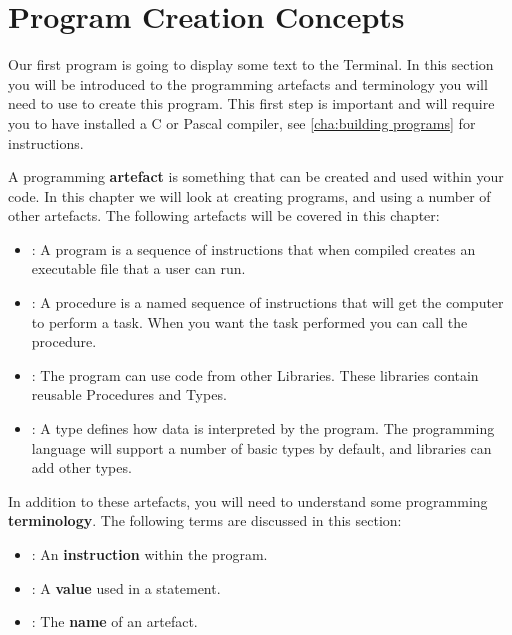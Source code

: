 \clearpage
\section{Program Creation Concepts} %
\label{sec:program_creation_concepts}

Our first program is going to display some text to the Terminal. In this section you will be introduced to the programming artefacts and terminology you will need to use to create this program. This first step is important and will require you to have installed a C or Pascal compiler, see \cref{cha:building programs}  for instructions.

A programming \textbf{artefact} is something that can be created and used within your code. In this chapter we will look at creating programs, and using a number of other artefacts. The following artefacts will be covered in this chapter:
\begin{itemize}
  \item {}: A program is a sequence of instructions that when compiled creates an executable file that a user can run.
  \item {}: A procedure is a named sequence of instructions that will get the computer to perform a task. When you want the task performed you can call the procedure.
  \item {}: The program can use code from other Libraries. These libraries contain reusable Procedures and Types. 
  \item {}: A type defines how data is interpreted by the program. The programming language will support a number of basic types by default, and libraries can add other types. 
\end{itemize}

In addition to these artefacts, you will need to understand some programming \textbf{terminology}. The following terms are discussed in this section:
\begin{itemize}
  \item {}: An \textbf{instruction} within the program.
  \item {}: A \textbf{value} used in a statement.
  \item {}: The \textbf{name} of an artefact.
\end{itemize}

